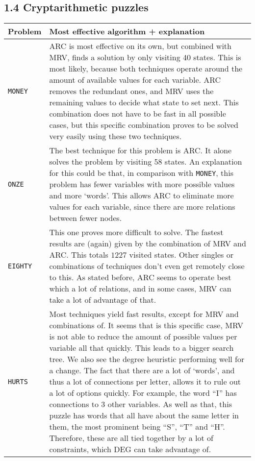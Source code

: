 \documentclass{article}
\begin{document}
\subsection*{1.4 \hspace*{0.3cm} Cryptarithmetic puzzles}
\begin{tabular}{L{1.7cm}|L{13cm}}
Problem & Most effective algorithm + explanation\\\hline
\verb|MONEY| & ARC is most effective on its own, but combined with MRV, finds a solution by only visiting 40 states. This is most likely, because both techniques operate around the amount of available values for each variable. ARC removes the redundant ones, and MRV uses the remaining values to decide what state to set next. This combination does not have to be fast in all possible cases, but this specific combination proves to be solved very easily using these two techniques. \\\hline
\verb|ONZE| & The best technique for this problem is ARC. It alone solves the problem by visiting 58 states. An explanation for this could be that, in comparison with \verb|MONEY|, this problem has fewer variables with more possible values and more `words'. This allows ARC to eliminate more values for each variable, since there are more relations between fewer nodes. \\\hline
\verb|EIGHTY| & This one proves more difficult to solve. The fastest results are (again) given by the combination of MRV and ARC. This totals $1227$ visited states. Other singles or combinations of techniques don't even get remotely close to this. As stated before, ARC seems to operate best which a lot of relations, and in some cases, MRV can take a lot of advantage of that. \\\hline
\verb|HURTS| & Most techniques yield fast results, except for MRV and combinations of. It seems that is this specific case, MRV is not able to reduce the amount of possible values per variable all that quickly. This leads to a bigger search tree. We also see the degree heuristic performing well for a change. The fact that there are a lot of `words', and thus a lot of connections per letter, allows it to rule out a lot of options quickly. For example, the word ``I'' has connections to 3 other variables. As well as that, this puzzle has words that all have about the same letter in them, the most prominent being ``S'', ``T'' and ``H''. Therefore, these are all tied together by a lot of constraints, which DEG can take advantage of.\\
\end{tabular}
\end{document}
